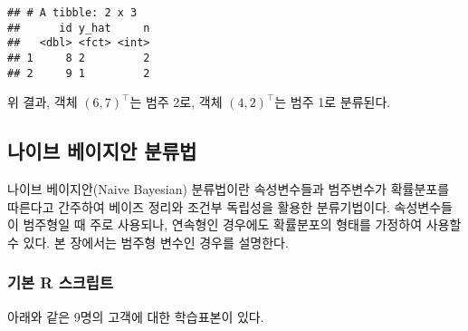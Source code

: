 \documentclass[]{book}
\begin{document}
\begin{verbatim}
## # A tibble: 2 x 3
##      id y_hat     n
##   <dbl> <fct> <int>
## 1     8 2         2
## 2     9 1         2
\end{verbatim}

위 결과, 객체 \((6, 7)^\top\)는 범주 2로, 객체 \((4, 2)^\top\)는 범주 1로 분류된다.

\hypertarget{naive-bayes}{%
\subsection{나이브 베이지안 분류법}\label{naive-bayes}}

나이브 베이지안(Naive Bayesian) 분류법이란 속성변수들과 범주변수가 확률분포를 따른다고 간주하여 베이즈 정리와 조건부 독립성을 활용한 분류기법이다. 속성변수들이 범주형일 때 주로 사용되나, 연속형인 경우에도 확률분포의 형태를 가정하여 사용할 수 있다. 본 장에서는 범주형 변수인 경우를 설명한다.

\hypertarget{naive-bayes-basic-script}{%
\subsubsection{기본 R 스크립트}\label{naive-bayes-basic-script}}

아래와 같은 9명의 고객에 대한 학습표본이 있다.
\end{document}
